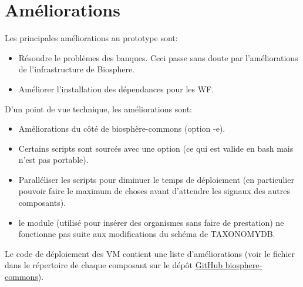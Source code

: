 \section{Améliorations}

Les principales améliorations au prototype sont:
\begin{itemize}
	\item Résoudre le problèmes des banques. Ceci passe sans doute par l'améliorations de l'infrastructure de Biosphere.
	\item Améliorer l'installation des dépendances pour les WF.
\end{itemize}

D'un point de vue technique, les améliorations sont:
\begin{itemize}
    \item Améliorations du côté de biosphère-commons (option -e).
    \item Certains scripts sont sourcés avec une option (ce qui est valide en bash mais n'est pas portable).
    \item Paralléliser les scripts pour diminuer le temps de déploiement (en particulier pouvoir faire le maximum de choses avant d'attendre les signaux des autres composants).
    \item le module  (utilisé pour insérer des organismes sans faire de prestation) ne fonctionne pas suite aux modifications du schéma de TAXONOMYDB.
\end{itemize}

Le code de déploiement des VM contient une liste d'améliorations (voir le fichier  dans le répertoire de chaque composant sur le dépôt \href{https://github.com/IFB-ElixirFr/biosphere-commons}{GitHub biosphere-commons}).
